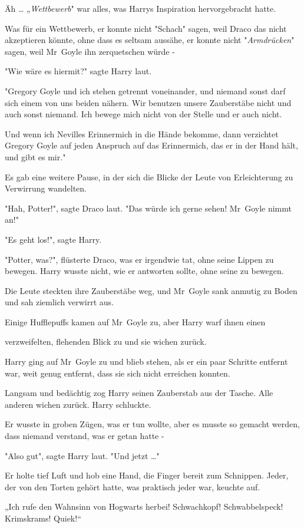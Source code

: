 {Äh … „\emph{Wettbewerb}" war alles, was Harrys Inspiration hervorgebracht hatte.

Was für ein Wettbewerb, er konnte nicht "Schach" sagen, weil Draco das nicht akzeptieren könnte, ohne dass es seltsam aussähe, er konnte nicht "\emph{Armdrücken}" sagen, weil Mr~Goyle ihn zerquetschen würde -

"Wie wäre es hiermit?" sagte Harry laut.

"Gregory Goyle und ich stehen getrennt voneinander, und niemand sonst darf sich einem von uns beiden nähern. Wir benutzen unsere Zauberstäbe nicht und auch sonst niemand. Ich bewege mich nicht von der Stelle und er auch nicht.

Und wenn ich Nevilles Erinnermich in die Hände bekomme, dann verzichtet Gregory Goyle auf jeden Anspruch auf das Erinnermich, das er in der Hand hält, und gibt es mir."

Es gab eine weitere Pause, in der sich die Blicke der Leute von Erleichterung zu Verwirrung wandelten.

"Hah, Potter!", sagte Draco laut. "Das würde ich gerne sehen! Mr~Goyle nimmt an!"

"Es geht los!", sagte Harry.

"Potter, was?", flüsterte Draco, was er irgendwie tat, ohne seine Lippen zu bewegen. Harry wusste nicht, wie er antworten sollte, ohne seine zu bewegen.

Die Leute steckten ihre Zauberstäbe weg, und Mr~Goyle sank anmutig zu Boden und sah ziemlich verwirrt aus.

Einige Hufflepuffs kamen auf Mr~Goyle zu, aber Harry warf ihnen einen

verzweifelten, flehenden Blick zu und sie wichen zurück.

Harry ging auf Mr~Goyle zu und blieb stehen, als er ein paar Schritte entfernt war, weit genug entfernt, dass sie sich nicht erreichen konnten.

Langsam und bedächtig zog Harry seinen Zauberstab aus der Tasche. Alle anderen wichen zurück. Harry schluckte.

Er wusste in groben Zügen, was er tun wollte, aber es musste so gemacht werden, dass niemand verstand, was er getan hatte -

"Also gut", sagte Harry laut. "Und jetzt …"

Er holte tief Luft und hob eine Hand, die Finger bereit zum Schnippen. Jeder, der von den Torten gehört hatte, was praktisch jeder war, keuchte auf.

„Ich rufe den Wahnsinn von Hogwarts herbei! Schwachkopf! Schwabbelspeck! Krimskrams! Quiek!“

}
